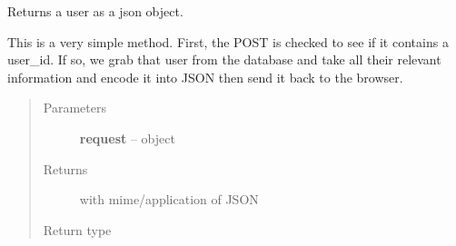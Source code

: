 \documentclass[letterpaper,10pt,english]{sphinxmanual}
\begin{document}
\begin{fulllineitems}
\label{timetracker:timetracker.utils.calendar_utils.get_user_data}
Returns a user as a json object.

This is a very simple method. First, the  POST is
checked to see if it contains a user\_id. If so, we grab that user from
the database and take all their relevant information and encode it into
JSON then send it back to the browser.
\begin{quote}\begin{description}
\item[{Parameters}] \leavevmode
\textbf{request} --  object

\item[{Returns}] \leavevmode
{} with mime/application of JSON

\item[{Return type}] \leavevmode
{}

\end{description}\end{quote}

\end{fulllineitems}

\end{document}
